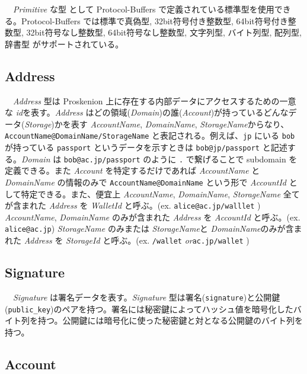 　\emph{Primitive} な型 として Protocol-Buffers\cite{3}
で定義されている標準型を使用できる。Protocol-Buffers では標準で真偽型,
32bit符号付き整数型, 64bit符号付き整数型, 32bit符号なし整数型,
64bit符号なし整数型, 文字列型, バイト列型, 配列型, 辞書型
がサポートされている。

\hypertarget{address}{%
\subsection{Address}\label{address}}

　\emph{Address} 型は Proskenion
上に存在する内部データにアクセスするための一意な
\emph{id}を表す。\emph{Address}
はどの領域(\emph{Domain})の誰(\emph{Account})が持っているどんなデータ(\emph{Storage})かを表す
\emph{AccountName}, \emph{DomainName}, \emph{StorageName}からなり、
\texttt{AccountName@DomainName/StorageName}
と表記される。例えば、\texttt{jp} にいる \texttt{bob} が持っている
\texttt{passport} というデータを示すときは \texttt{bob@jp/passport}
と記述する。\emph{Domain} は \texttt{bob@ac.jp/passport} のように
\texttt{.} で繋げることで subdomain を定義できる。また \emph{Account}
を特定するだけであれば \emph{AccountName} と \emph{DomainName}
の情報のみで \texttt{AccountName@DomainName} という形で \emph{AccountId}
として特定できる。また、便宜上 \emph{AccountName}, \emph{DomainName},
\emph{StorageName} 全てが含まれた \emph{Address} を \emph{WalletId}
と呼ぶ。(ex. \texttt{alice@ac.jp/walllet} ) \emph{AccountName},
\emph{DomainName} のみが含まれた \emph{Address} を \emph{AccountId}
と呼ぶ。(ex. \texttt{alice@ac.jp}) \emph{StorageName} のみまたは
\emph{StorageName}と \emph{DomainName}のみが含まれた \emph{Address} を
\emph{StorageId} と呼ぶ。(ex. \texttt{/wallet}
\emph{or}\texttt{ac.jp/wallet} )

\hypertarget{signature}{%
\subsection{Signature}\label{signature}}

　\emph{Signature} は署名データを表す。\emph{Signature}
型は署名(\texttt{signature})と公開鍵(\texttt{public\_key})のペアを持つ。署名には秘密鍵によってハッシュ値を暗号化したバイト列を持つ。公開鍵には暗号化に使った秘密鍵と対となる公開鍵のバイト列を持つ。

\hypertarget{account}{%
\subsection{Account}\label{account}}

